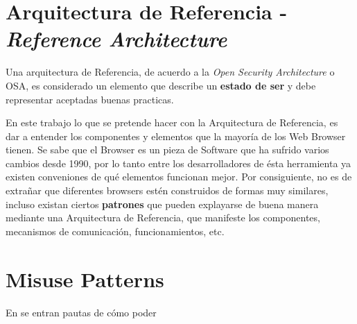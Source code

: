 \section{Arquitectura de Referencia - \textit{Reference Architecture}}
Una arquitectura de Referencia, de acuerdo a la \textit{Open Security Architecture} o OSA\cite{openSecArch}, es considerado un elemento que describe un \textbf{estado de ser} y debe representar aceptadas buenas practicas. 

En este trabajo lo que se pretende hacer con la Arquitectura de Referencia, es dar a entender los componentes y elementos que la mayoría de los Web Browser tienen. Se sabe que el Browser es un pieza de Software que ha sufrido varios cambios desde 1990, por lo tanto entre los desarrolladores de ésta herramienta ya existen conveniones de qué elementos funcionan mejor. Por consiguiente, no es de extrañar que diferentes browsers estén construidos de formas muy similares, incluso existan ciertos \textbf{patrones} que pueden explayarse de buena manera mediante una Arquitectura de Referencia, que manifeste los componentes, mecanismos de comunicación, funcionamientos, etc.

\section{Misuse Patterns}
En \cite{ModMisusePatt} se entran pautas de cómo poder
